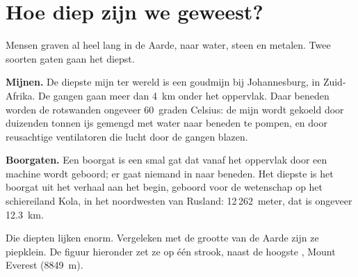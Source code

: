 \section{Hoe diep zijn we geweest?}

Mensen graven al heel lang in de Aarde, naar water, steen en metalen. Twee
soorten gaten gaan het diepst.

\textbf{Mijnen.} De diepste mijn ter wereld is een goudmijn bij
Johannesburg, in Zuid-Afrika. De gangen gaan meer dan 4~km onder het
oppervlak. Daar beneden worden de rotswanden ongeveer 60~graden Celsius:
de mijn wordt gekoeld door duizenden tonnen ijs gemengd met water naar
beneden te pompen, en door reusachtige ventilatoren die lucht door de
gangen blazen.

\textbf{Boorgaten.} Een boorgat is een smal gat dat vanaf het oppervlak
door een machine wordt geboord; er gaat niemand in naar beneden. Het
diepste is het boorgat uit het verhaal aan het begin, geboord voor de
wetenschap op het schiereiland Kola, in het noordwesten van Rusland:
12\,262~meter, dat is ongeveer 12.3~km.

Die diepten lijken enorm. Vergeleken met de grootte van de Aarde zijn ze
piepklein. De figuur hieronder zet ze op één strook, naast de hoogste ,
Mount Everest (8849~m).

